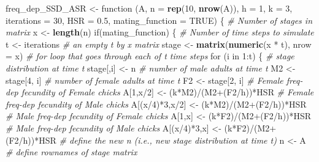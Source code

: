 \documentclass[]{article}
\newenvironment{Shaded}{\begin{snugshade}}{\end{snugshade}}
\newcommand{\KeywordTok}[1]{\textcolor[rgb]{0.13,0.29,0.53}{\textbf{{#1}}}}
\newcommand{\DataTypeTok}[1]{\textcolor[rgb]{0.13,0.29,0.53}{{#1}}}
\newcommand{\DecValTok}[1]{\textcolor[rgb]{0.00,0.00,0.81}{{#1}}}
\newcommand{\FloatTok}[1]{\textcolor[rgb]{0.00,0.00,0.81}{{#1}}}
\newcommand{\StringTok}[1]{\textcolor[rgb]{0.31,0.60,0.02}{{#1}}}
\newcommand{\CommentTok}[1]{\textcolor[rgb]{0.56,0.35,0.01}{\textit{{#1}}}}
\newcommand{\OtherTok}[1]{\textcolor[rgb]{0.56,0.35,0.01}{{#1}}}
\newcommand{\NormalTok}[1]{{#1}}
\begin{document}
\begin{Shaded}
\begin{Highlighting}[]
\NormalTok{freq_dep_SSD_ASR <-}\StringTok{ }
\StringTok{  }\NormalTok{function (A, }\DataTypeTok{n =} \KeywordTok{rep}\NormalTok{(}\DecValTok{10}\NormalTok{, }\KeywordTok{nrow}\NormalTok{(A)), }\DataTypeTok{h =} \DecValTok{1}\NormalTok{, }\DataTypeTok{k =} \DecValTok{3}\NormalTok{, }
            \DataTypeTok{iterations =} \DecValTok{30}\NormalTok{, }\DataTypeTok{HSR =} \FloatTok{0.5}\NormalTok{, }\DataTypeTok{mating_function =} \OtherTok{TRUE}\NormalTok{) }
  \NormalTok{\{}
    \CommentTok{# Number of stages in matrix}
    \NormalTok{x <-}\StringTok{ }\KeywordTok{length}\NormalTok{(n) }
    \NormalTok{if(mating_function)}
    \NormalTok{\{}
      \CommentTok{# Number of time steps to simulate}
      \NormalTok{t <-}\StringTok{ }\NormalTok{iterations }
      \CommentTok{# an empty t by x matrix}
      \NormalTok{stage <-}\StringTok{ }\KeywordTok{matrix}\NormalTok{(}\KeywordTok{numeric}\NormalTok{(x *}\StringTok{ }\NormalTok{t), }\DataTypeTok{nrow =} \NormalTok{x) }
      \CommentTok{# for loop that goes through each of t time steps}
      \NormalTok{for (i in }\DecValTok{1}\NormalTok{:t) \{ }
        \CommentTok{# stage distribution at time t}
        \NormalTok{stage[,i] <-}\StringTok{ }\NormalTok{n }
        \CommentTok{# number of male adults at time t}
        \NormalTok{M2 <-}\StringTok{ }\NormalTok{stage[}\DecValTok{4}\NormalTok{, i] }
        \CommentTok{# number of female adults at time t}
        \NormalTok{F2 <-}\StringTok{ }\NormalTok{stage[}\DecValTok{2}\NormalTok{, i] }
        \CommentTok{# Female freq-dep fecundity of Female chicks}
        \NormalTok{A[}\DecValTok{1}\NormalTok{,x/}\DecValTok{2}\NormalTok{]        <-}\StringTok{ }\NormalTok{(k*M2)/(M2+(F2/h))*HSR }
        \CommentTok{# Female freq-dep fecundity of Male chicks}
        \NormalTok{A[(x/}\DecValTok{4}\NormalTok{)*}\DecValTok{3}\NormalTok{,x/}\DecValTok{2}\NormalTok{]  <-}\StringTok{ }\NormalTok{(k*M2)/(M2+(F2/h))*HSR}
        \CommentTok{# Male freq-dep fecundity of Female chicks}
        \NormalTok{A[}\DecValTok{1}\NormalTok{,x]          <-}\StringTok{ }\NormalTok{(k*F2)/(M2+(F2/h))*HSR }
        \CommentTok{# Male freq-dep fecundity of Male chicks}
        \NormalTok{A[(x/}\DecValTok{4}\NormalTok{)*}\DecValTok{3}\NormalTok{,x]    <-}\StringTok{ }\NormalTok{(k*F2)/(M2+(F2/h))*HSR }
        \CommentTok{# define the new n (i.e., new stage distribution at time t)}
        \NormalTok{n <-}\StringTok{ }\NormalTok{A %
        \CommentTok{# define rownames of stage matrix}
}
\end{Highlighting}
\end{Shaded}
\end{document}
